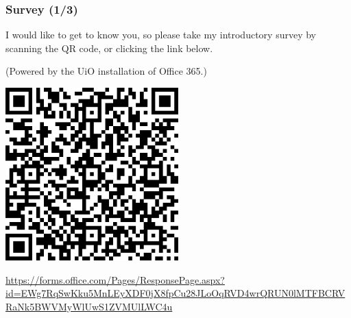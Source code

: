 \def\arraystretch{1.2}

\begin{frame}

\frametitle{Survey (1/3)}

\begin{center}

I would like to get to know you, so please take my introductory survey
by scanning the QR code, or clicking the link below.

(Powered by the UiO installation of Office 365.)

\vspace{\fill}

\includegraphics[width=0.5\textwidth]{survey-qr-code.png}

\vspace{\fill}

\noindent\scriptsize{\url{https://forms.office.com/Pages/ResponsePage.aspx?id=EWg7RqSwKku5MnLEyXDF0jX8fpCu28JLoOqRVD4wrQRUN0lMTFBCRVRaNk5BWVMyWlUwS1ZVMUlLWC4u}}


\end{center}

\end{frame}

